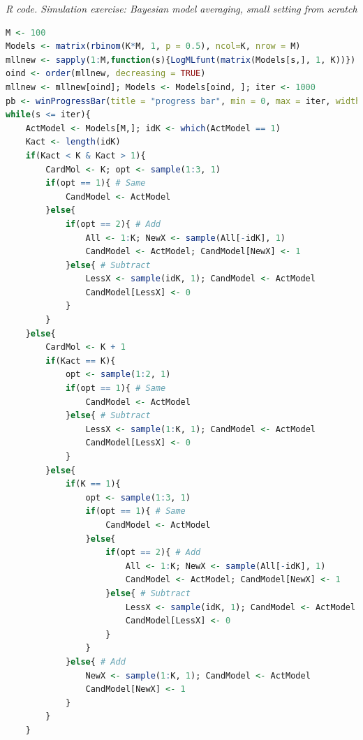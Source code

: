 \begin{tcolorbox}[enhanced,width=4.67in,center upper,
	fontupper=\large\bfseries,drop shadow southwest,sharp corners]
	\textit{R code. Simulation exercise: Bayesian model averaging, small setting from scratch}
	\begin{VF}
		\begin{lstlisting}[language=R]
M <- 100
Models <- matrix(rbinom(K*M, 1, p = 0.5), ncol=K, nrow = M)
mllnew <- sapply(1:M,function(s){LogMLfunt(matrix(Models[s,], 1, K))})
oind <- order(mllnew, decreasing = TRUE)
mllnew <- mllnew[oind]; Models <- Models[oind, ]; iter <- 1000
pb <- winProgressBar(title = "progress bar", min = 0, max = iter, width = 300); s <- 1
while(s <= iter){
	ActModel <- Models[M,]; idK <- which(ActModel == 1)
	Kact <- length(idK)
	if(Kact < K & Kact > 1){
		CardMol <- K; opt <- sample(1:3, 1)
		if(opt == 1){ # Same
			CandModel <- ActModel
		}else{
			if(opt == 2){ # Add
				All <- 1:K; NewX <- sample(All[-idK], 1)
				CandModel <- ActModel; CandModel[NewX] <- 1
			}else{ # Subtract
				LessX <- sample(idK, 1); CandModel <- ActModel
				CandModel[LessX] <- 0
			}
		}
	}else{
		CardMol <- K + 1
		if(Kact == K){
			opt <- sample(1:2, 1)
			if(opt == 1){ # Same
				CandModel <- ActModel
			}else{ # Subtract
				LessX <- sample(1:K, 1); CandModel <- ActModel
				CandModel[LessX] <- 0
			}
		}else{
			if(K == 1){
				opt <- sample(1:3, 1)
				if(opt == 1){ # Same
					CandModel <- ActModel
				}else{
					if(opt == 2){ # Add
						All <- 1:K; NewX <- sample(All[-idK], 1)
						CandModel <- ActModel; CandModel[NewX] <- 1
					}else{ # Subtract
						LessX <- sample(idK, 1); CandModel <- ActModel
						CandModel[LessX] <- 0
					}
				}
			}else{ # Add
				NewX <- sample(1:K, 1); CandModel <- ActModel
				CandModel[NewX] <- 1
			}
		}
	}
\end{lstlisting}
	\end{VF}
\end{tcolorbox} 

